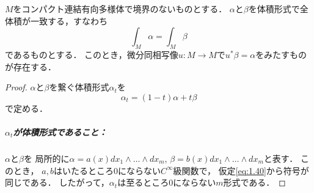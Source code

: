 \begin{THM}[Moser]
    \(M\)をコンパクト連結有向多様体で境界のないものとする．
    \(\alpha\)と\(\beta\)を体積形式で全体積が一致する，すなわち
    \begin{equation}
        \int_{M}^{}\alpha=
        \int_{M}^{}\beta\label{eq:1.40}
    \end{equation}
    であるものとする．
    このとき，微分同相写像\(u\colon M\to M\)で\(
        u^{\ast}\beta=\alpha
    \)をみたすものが存在する．
\end{THM}

\begin{proof}
    \(\alpha\)と\(\beta\)を繋ぐ体積形式\(\alpha_t\)を
    \[
        \alpha_t=(1-t)\alpha+t\beta
    \]で定める．
    \subparagraph*{\(\alpha_t\)が体積形式であること：}
    \(\alpha\)と\(\beta\)を
    局所的に\(\alpha=a(x)dx_1\wedge\dots\wedge dx_m\), 
    \(\beta=b(x)dx_1\wedge\dots\wedge dx_m\)と表す．
    このとき，
    \(a,b\)はいたるところ\(0\)にならない\(C^\infty\)級関数で，
    仮定\eqref{eq:1.40}から符号が同じである．
    したがって，\(\alpha_t\)は至るところ\(0\)にならない\(m\)形式である．


\end{proof}
